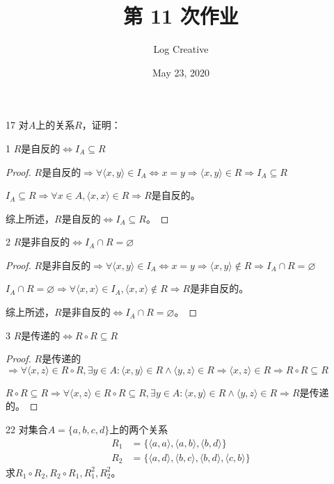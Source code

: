 \documentclass[12pt]{article}
\title{第 11 次作业}
\author{Log Creative}
\date{May 23, 2020}
\newenvironment{firstlayer}%
{\begin{list}{}{\renewcommand{\makelabel}[1]{\textbf{##1}.\hfil}
}}
{\end{list}}
\newenvironment{secondlayer}%
{\begin{list}{}{\renewcommand{\makelabel}[1]{(##1)\hfil}
}}
{\end{list}}
\begin{document}
\begin{CJK}{UTF8}{gbsn}

\maketitle

\begin{firstlayer}
  \item[17] 对$A$上的关系$R$，证明：
  \begin{secondlayer}
    \item[1] $R$是自反的$\Leftrightarrow I_A\subseteq R$
    \begin{proof}
      $R$是自反的$\Rightarrow \forall\langle x,y\rangle\in I_A\Leftrightarrow x=y\Rightarrow \langle x,y \rangle\in R\Rightarrow I_A\subseteq R$

$I_A\subseteq R\Rightarrow \forall x\in A,\langle x,x\rangle\in R\Rightarrow R$是自反的。

综上所述，$R$是自反的$\Leftrightarrow I_A\subseteq R$。
    \end{proof}
    \item[2]$R$是非自反的$\Leftrightarrow I_A\cap R=\varnothing$
    \begin{proof}
      $R$是非自反的$\Rightarrow \forall\langle x,y\rangle\in I_A\Leftrightarrow x=y\Rightarrow \langle x,y \rangle\notin R\Rightarrow I_A\cap R=\varnothing$

$I_A\cap R=\varnothing\Rightarrow \forall\langle x,x\rangle\in I_A,\langle x,x \rangle\notin R\Rightarrow R$是非自反的。

综上所述，$R$是非自反的$\Leftrightarrow I_A\cap R=\varnothing$。
    \end{proof}
    \item[3]$R$是传递的$\Leftrightarrow R\circ R\subseteq R$
    \begin{proof}
      $R$是传递的$\Rightarrow \forall\langle x,z\rangle\in R\circ R,\exists y\in A:\langle x,y\rangle\in R\wedge\langle y,z\rangle\in R\Rightarrow\langle x,z\rangle\in R\Rightarrow R\circ R\subseteq R$

$R\circ R\subseteq R\Rightarrow \forall\langle x,z\rangle\in R\circ R\subseteq R,\exists y\in A:\langle x,y\rangle\in R\wedge\langle y,z\rangle\in R\Rightarrow R$是传递的。
    \end{proof}
  \end{secondlayer}
  \item[22]对集合$A=\{a,b,c,d\}$上的两个关系
  \begin{align*}
    R_1&=\{\langle a,a \rangle,\langle a,b\rangle,\langle b,d \rangle\}\\
    R_2&=\{\langle a,d \rangle,\langle b,c \rangle,\langle b,d \rangle,\langle c,b \rangle\}
  \end{align*}
  求$R_1\circ R_2,R_2\circ R_1,R_1^2,R_2^2$。
  

\end{firstlayer}
\end{CJK}
\end{document}
